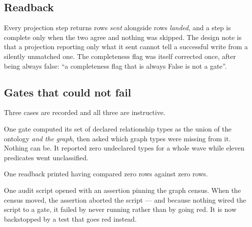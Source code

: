 \subsection{Readback}

Every projection step returns rows \emph{sent} alongside rows \emph{landed}, and a
step is complete only when the two agree and nothing was skipped. The design note is
that a projection reporting only what it sent cannot tell a successful write from a
silently unmatched one. The completeness flag was itself corrected once, after being
always false: ``a completeness flag that is always False is not a gate''.

\subsection{Gates that could not fail}

Three cases are recorded and all three are instructive.

One gate computed its set of declared relationship types as the union of the ontology
\emph{and the graph}, then asked which graph types were missing from it. Nothing can
be. It reported zero undeclared types for a whole wave while eleven predicates went
unclassified.

One readback printed  having compared zero rows against zero
rows.

One audit script opened with an assertion pinning the graph census. When the census
moved, the assertion aborted the script --- and because nothing wired the script to a
gate, it failed by never running rather than by going red. It is now backstopped by a
test that goes red instead.

